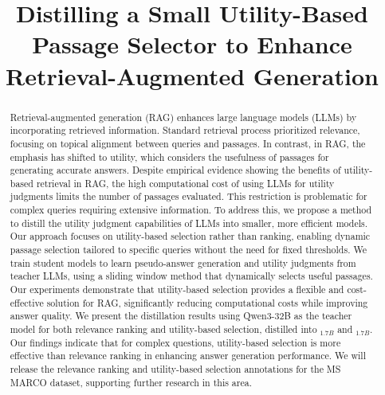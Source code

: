 \documentclass[sigconf]{acmart}
\begin{document}
\title{Distilling a Small Utility-Based Passage Selector to Enhance Retrieval-Augmented Generation}

\begin{abstract}
Retrieval-augmented generation (RAG) enhances large language models (LLMs) by incorporating retrieved information. Standard retrieval process prioritized relevance, focusing on topical alignment between queries and passages. In contrast, in RAG, the emphasis has shifted to utility, which considers the usefulness of passages for generating accurate answers.
Despite empirical evidence showing the benefits of utility-based retrieval in RAG, the high computational cost of using LLMs for utility judgments limits the number of passages evaluated. 
This restriction is problematic for complex queries requiring extensive information. To address this, we propose a method to distill the utility judgment capabilities of LLMs into smaller, more efficient models. Our approach focuses on utility-based selection rather than ranking, enabling dynamic passage selection tailored to specific queries without the need for fixed thresholds. We train student models to learn pseudo-answer generation and utility judgments from teacher LLMs, using a sliding window method that dynamically selects useful passages. Our experiments demonstrate that utility-based selection provides a flexible and cost-effective solution for RAG, significantly reducing computational costs while improving answer quality. We present the distillation results using Qwen3-32B as the teacher model for both relevance ranking and utility-based selection, distilled into \rank$_{1.7B}$ and \utility$_{1.7B}$. 
Our findings indicate that for complex questions, utility-based selection is more effective than relevance ranking in enhancing answer generation performance. We will release the relevance ranking and utility-based selection annotations for the MS MARCO dataset, supporting further research in this area.

\end{abstract}
\end{document}
